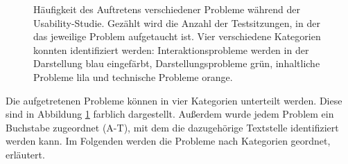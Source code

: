 \begin{figure}[!ht]
  \caption[Häufigkeit des Auftretens verschiedener Usability-Probleme]{Häufigkeit des Auftretens verschiedener Probleme während der Usability-Studie. Gezählt wird die Anzahl der Testsitzungen, in der das jeweilige Problem aufgetaucht ist. Vier verschiedene Kategorien konnten identifiziert werden: Interaktionsprobleme werden in der Darstellung blau eingefärbt, Darstellungsprobleme grün, inhaltliche Probleme lila und technische Probleme orange.}
  \label{fig:problems}
\end{figure}

Die aufgetretenen Probleme können in vier Kategorien unterteilt werden. Diese sind in Abbildung \ref{fig:problems} farblich dargestellt. Außerdem wurde jedem Problem ein Buchstabe zugeordnet (A-T), mit dem die dazugehörige Textstelle identifiziert werden kann. Im Folgenden werden die Probleme nach Kategorien geordnet, erläutert.

